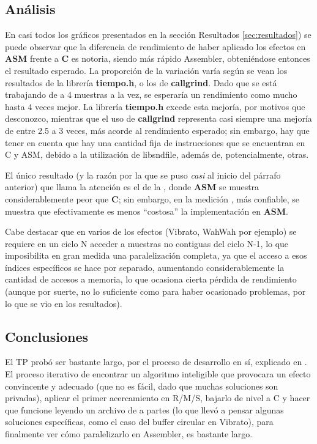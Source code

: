 \subsection{Análisis}
En casi todos los gráficos presentados en la sección Resultados \ref{sec:resultados}) se puede observar que la diferencia de rendimiento de haber aplicado los efectos en \textbf{ASM} frente a \textbf{C} es notoria, siendo más rápido Assembler, obteniéndose entonces el resultado esperado. La proporción de la variación varía según se vean los resultados de la librería \textbf{tiempo.h}, o los de \textbf{callgrind}. Dado que se está trabajando de a 4 muestras a la vez, se esperaría un rendimiento como mucho hasta 4 veces mejor. La librería \textbf{tiempo.h} excede esta mejoría, por motivos que desconozco, mientras que el uso de \textbf{callgrind} representa casi siempre una mejoría de entre 2.5 a 3 veces, más acorde al rendimiento esperado; sin embargo, hay que tener en cuenta que hay una cantidad fija de instrucciones que se encuentran en C y ASM, debido a la utilización de libsndfile, además de, potencialmente, otras.

El único resultado (y la razón por la que se puso \textit{casi} al inicio del párrafo anterior) que llama la atención es el de la , donde \textbf{ASM} se muestra considerablemente peor que \textbf{C}; sin embargo, en la medición , más confiable, se muestra que efectivamente es menos ``costosa'' la implementación en \textbf{ASM}.

Cabe destacar que en varios de los efectos (Vibrato, WahWah por ejemplo) se requiere en un ciclo N acceder a muestras no contiguas del ciclo N-1, lo que imposibilita en gran medida una paralelización completa, ya que el acceso a esos índices específicos se hace por separado, aumentando considerablemente la cantidad de accesos a memoria, lo que ocasiona cierta pérdida de rendimiento (aunque por suerte, no lo suficiente como para haber ocasionado problemas, por lo que se vio en los resultados).

\subsection{Conclusiones}
El TP probó ser bastante largo, por el proceso de desarrollo en sí, explicado en . El proceso iterativo de encontrar un algoritmo inteligible que provocara un efecto convincente y adecuado (que no es fácil, dado que muchas soluciones son privadas), aplicar el primer acercamiento en R/M/S, bajarlo de nivel a C y hacer que funcione leyendo un archivo de a partes (lo que llevó a pensar algunas soluciones específicas, como el caso del buffer circular en Vibrato), para finalmente ver cómo paralelizarlo en Assembler, es bastante largo.

